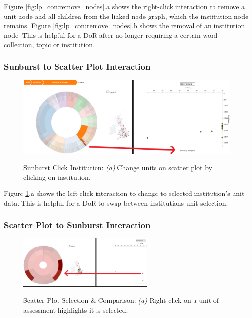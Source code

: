 \documentclass[a4paper, 11pt]{article}
\begin{document}
\noindent Figure \ref{fig:lp_con:remove_nodes}.a shows the right-click interaction to remove a unit node and all children from the linked node graph, which the institution node remains. Figure \ref{fig:lp_con:remove_nodes}.b shows the removal of an institution node. This is helpful for a DoR after no longer requiring a certain word collection, topic or institution.

\subsubsection{Sunburst to Scatter Plot Interaction}

\begin{figure}[hbt!]
	\centering
      \includegraphics[width=\textwidth]{imgs/sb_sc_int/SB_SC_changedata.png} \\
	\caption{Sunburst Click Institution: 
	\textit{(a)} Change units on scatter plot by clicking on institution.}
    \label{fig:sb_sc_int:changedata}
     \noindent\makebox[\linewidth]{\rule{\textwidth}{0.4pt}}
\end{figure}

\noindent Figure \ref{fig:sb_sc_int:changedata}.a shows the left-click interaction to change to selected institution's unit data. This is helpful for a DoR to swap between institutions unit selection.


\subsubsection{Scatter Plot to Sunburst Interaction}
\begin{figure}[hbt!]
	\centering
      \includegraphics[width=0.6\textwidth]{imgs/sc_sb_int/select_UoA_and_compare.png} \\
	\caption{Scatter Plot Selection \& Comparison: 
	\textit{(a)} Right-click on a unit of assessment highlights it is selected.}
    \label{fig:sc_sb_int:uoa_select}
    \noindent\makebox[\linewidth]{\rule{\textwidth}{0.4pt}}
\end{figure}
\end{document}
